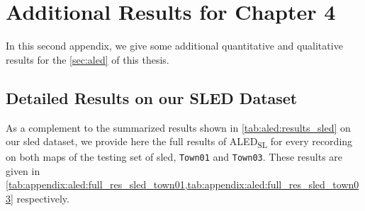 \chapter{Additional Results for Chapter 4}
In this second appendix, we give some additional quantitative and qualitative results for the \cref{sec:aled} of this thesis.

\section{Detailed Results on our SLED Dataset}\label{sec:appendix:aled:sled_full}
As a complement to the summarized results shown in \cref{tab:aled:results_sled} on our \acrshort{sled} dataset, we provide here the full results of ALED\textsubscript{SL} for every recording on both maps of the testing set of \acrshort{sled}, \verb|Town01| and \verb|Town03|. These results are given in \cref{tab:appendix:aled:full_res_sled_town01,tab:appendix:aled:full_res_sled_town03} respectively.

